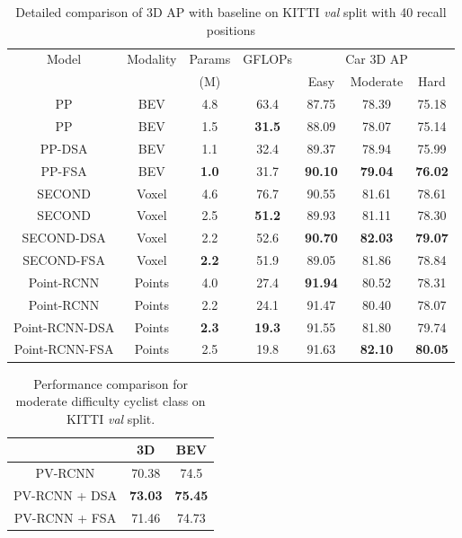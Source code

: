 \documentclass[10pt,twocolumn,letterpaper]{article}
\begin{document}
\begin{table*}[h]
\centering
    \begin{tabular*}{\textwidth}{|c|c|cc|ccc|}
        \hline
        Model & Modality & Params & GFLOPs & \multicolumn{3}{c|}{Car 3D AP} \\ 
        & & (M) & & Easy & Moderate & Hard \\
        \hline
        PP \cite{pointpillars} & BEV & 4.8 & 63.4 & 87.75 & 78.39 & 75.18
         \\
         PP & BEV & 1.5 & \textbf{31.5} & 88.09 & 78.07 & 75.14
        \\
         PP-DSA & BEV & 1.1 & 32.4 & 89.37 & 78.94 & 75.99
        \\
        PP-FSA & BEV & \textbf{1.0} & 31.7 & \textbf{90.10} & \textbf{79.04} & \textbf{76.02}
        \\
        \hline
    SECOND \cite{SECOND} & Voxel & 4.6 & 76.7 & 90.55 & 81.61 & 78.61
         \\
         SECOND & Voxel & 2.5 & \textbf{51.2} & 89.93 & 81.11 & 78.30
        \\
         SECOND-DSA & Voxel & 2.2 & 52.6 & \textbf{90.70} & \textbf{82.03} & \textbf{79.07}
        \\
        SECOND-FSA & Voxel & \textbf{2.2} & 51.9 & 89.05 & 81.86 & 78.84
        \\
        \hline
        Point-RCNN \cite{PointRCNN} & Points & 4.0 & 27.4 & \textbf{91.94} & 80.52 & 78.31
         \\
         Point-RCNN & Points & 2.2 & 24.1 & 91.47 & 80.40 & 78.07
        \\
         Point-RCNN-DSA & Points & \textbf{2.3} & \textbf{19.3} & 91.55 & 81.80 & 79.74
        \\
        Point-RCNN-FSA & Points & 2.5 & 19.8 & 91.63 & \textbf{82.10} & \textbf{80.05}
        \\
        \hline
    \end{tabular*}
    \caption{Detailed comparison of 3D AP with baseline on KITTI \textit{val} split with 40 recall positions}
    \label{tab:kitti_val_details}
\end{table*}
 \setlength{\tabcolsep}{1pt}
\begin{table}[h]
    \centering
    \begin{tabular}{c||cc}
        \hline
        & {3D} & {BEV}  \\
        \hline
        PV-RCNN \cite{PVRCNN} & 70.38 & 74.5 \\
        PV-RCNN + DSA & \bf{73.03} &\bf{75.45}  \\
        PV-RCNN + FSA & 71.46 & 74.73  \\
        \hline
    \end{tabular}
    \caption{Performance comparison for moderate difficulty cyclist class on KITTI \textit{val} split.}
    \label{tab:kitti_val_cyclist}
\end{table}
\end{document}
